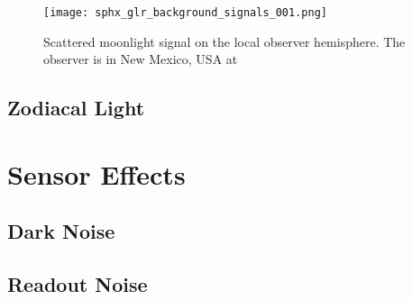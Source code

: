 \begin{figure}[ht]
  \centering
  \texttt{[image: sphx\_glr\_background\_signals\_001.png]}
  \caption{Scattered moonlight signal on the local observer hemisphere. The observer is in New Mexico, USA at
  \pogslla}
  \label{fig:moonlighthemi}
\end{figure}

\subsection{Zodiacal Light}

\section{Sensor Effects}

\subsection{Dark Noise}
\subsection{Readout Noise}
